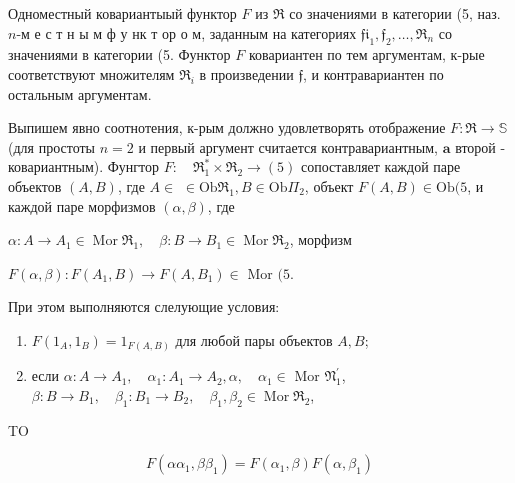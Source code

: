 \documentclass[10pt]{article}
\begin{document}
Одноместный ковариантыый функтор $F$ из $\Re$ со значениями в категории (5, наз. $n$-м е с т н ы м ф у нк т ор о м, заданным на категориях $\mathfrak{f i}_{1}, \mathfrak{f}_{2}, \ldots, \mathfrak{\Re}_{n}$ со значениями в категории (5. Функтор $F$ ковариантен по тем аргументам, к-рые соответствуют множителям $\mathfrak{R}_{i}$ в произведении $\mathfrak{f}$, и контравариантен по остальным аргументам.



Выпишем явно соотнотения, к-рым должно удовлетворять отображение $F: \mathfrak{\Re} \rightarrow \mathbb{S}$ (для простоты $n=2$ и первый аргумент считается контравариантным, $\mathbf{a}$ второй - ковариантным). Фунгтор $F: \quad \mathfrak{\Re}_{1}^{*} \times \mathfrak{R}_{2} \rightarrow(5)$ сопоставляет каждой паре объектов $(A, B)$, где $A \in$ $\in \mathrm{Ob} \mathfrak{\Re}_{1}, B \in \mathrm{Ob} \mathfrak{\Pi}_{2}$, объект $F(A, B) \in \mathrm{Ob}(5$, и каждой паре морфизмов $(\alpha, \beta)$, где



$\alpha: A \longrightarrow A_{1} \in \operatorname{Mor} \Re_{1}, \quad \beta: B \longrightarrow B_{1} \in \operatorname{Mor} \Re_{2}$, морфизм



$F(\alpha, \beta): F\left(A_{1}, B\right) \rightarrow F\left(A, B_{1}\right) \in$ Mor $(5$.



При этом выполняются слелующие условия:



\begin{enumerate}

  \item $F\left(1_{A}, 1_{B}\right)=1_{F(A, B)}$ для любой пары объектов $A, B$;



  \item если $\alpha: A \rightarrow A_{1}, \quad \alpha_{1}: A_{1} \rightarrow A_{2}, \alpha, \quad \alpha_{1} \in$ Mor $\mathfrak{N}_{1}^{\prime}$, $\beta: B \longrightarrow B_{1}, \quad \beta_{1}: B_{1} \longrightarrow B_{2}, \quad \beta_{1}, \beta_{2} \in \operatorname{Mor} \Re_{2}$,



\end{enumerate}



TO



\[

F\left(\alpha \alpha_{1}, \beta \beta_{1}\right)=F\left(\alpha_{1}, \beta\right) F\left(\alpha, \beta_{1}\right)

\]
\end{document}
